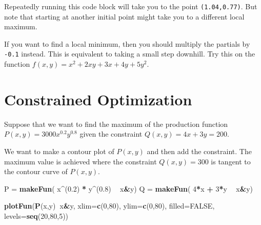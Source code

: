 \documentclass[
]{book}
\newenvironment{Shaded}{\begin{snugshade}}{\end{snugshade}}
\newcommand{\DataTypeTok}[1]{\textcolor[rgb]{0.13,0.29,0.53}{#1}}
\newcommand{\DecValTok}[1]{\textcolor[rgb]{0.00,0.00,0.81}{#1}}
\newcommand{\FloatTok}[1]{\textcolor[rgb]{0.00,0.00,0.81}{#1}}
\newcommand{\KeywordTok}[1]{\textcolor[rgb]{0.13,0.29,0.53}{\textbf{#1}}}
\newcommand{\NormalTok}[1]{#1}
\newcommand{\OperatorTok}[1]{\textcolor[rgb]{0.81,0.36,0.00}{\textbf{#1}}}
\newcommand{\OtherTok}[1]{\textcolor[rgb]{0.56,0.35,0.01}{#1}}
\newcommand{\StringTok}[1]{\textcolor[rgb]{0.31,0.60,0.02}{#1}}
\begin{document}
Repeatedly running this code block will take you to the point \texttt{(1.04,0.77)}. But note that starting at another initial point might take you to a different local maximum.

If you want to find a local minimum, then you should multiply the partials by \texttt{-0.1} instead. This is equivalent to taking a small step downhill. Try this on the function \(f(x,y) = x^2 + 2 x y + 3 x + 4 y + 5 y^2\).

\hypertarget{constrained-optimization}{%
\section{Constrained Optimization}\label{constrained-optimization}}

Suppose that we want to find the maximum of the production function \(P(x,y)=3000x^{0.2}y^{0.8}\) given the constraint \(Q(x,y)= 4x + 3y = 200\).

We want to make a contour plot of \(P(x,y)\) and then add the constraint. The maximum value is achieved where the constraint \(Q(x,y)=300\) is tangent to the contour curve of \(P(x,y)\).

\begin{Shaded}
\begin{Highlighting}[]
\NormalTok{P =}\StringTok{ }\KeywordTok{makeFun}\NormalTok{( x}\OperatorTok{^}\NormalTok{(}\FloatTok{0.2}\NormalTok{) }\OperatorTok{*}\StringTok{ }\NormalTok{y}\OperatorTok{^}\NormalTok{(}\FloatTok{0.8}\NormalTok{) }\OperatorTok{~}\StringTok{ }\NormalTok{x}\OperatorTok{&}\NormalTok{y)}
\NormalTok{Q =}\StringTok{ }\KeywordTok{makeFun}\NormalTok{( }\DecValTok{4}\OperatorTok{*}\NormalTok{x }\OperatorTok{+}\StringTok{ }\DecValTok{3}\OperatorTok{*}\NormalTok{y }\OperatorTok{~}\StringTok{ }\NormalTok{x}\OperatorTok{&}\NormalTok{y)}

\KeywordTok{plotFun}\NormalTok{(}\KeywordTok{P}\NormalTok{(x,y)}\OperatorTok{~}\NormalTok{x}\OperatorTok{&}\NormalTok{y, }\DataTypeTok{xlim=}\KeywordTok{c}\NormalTok{(}\DecValTok{0}\NormalTok{,}\DecValTok{80}\NormalTok{), }\DataTypeTok{ylim=}\KeywordTok{c}\NormalTok{(}\DecValTok{0}\NormalTok{,}\DecValTok{80}\NormalTok{), }\DataTypeTok{filled=}\OtherTok{FALSE}\NormalTok{, }\DataTypeTok{levels=}\KeywordTok{seq}\NormalTok{(}\DecValTok{20}\NormalTok{,}\DecValTok{80}\NormalTok{,}\DecValTok{5}\NormalTok{))}
\end{Highlighting}
\end{Shaded}
\end{document}
